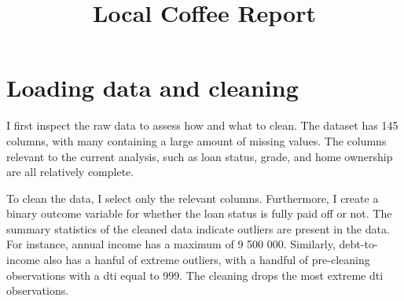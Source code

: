 \documentclass[11pt,preprint]{elsarticle}
\numberwithin{equation}{section}
\numberwithin{figure}{section}
\numberwithin{table}{section}
\begin{document}
\begin{frontmatter}  %

\title{Local Coffee Report}













\vspace{1cm}





\vspace{0.5cm}

\end{frontmatter}

\setcounter{footnote}{0}



\pagestyle{fancy}
\chead{}
\rhead{}
\lfoot{}
\lhead{}
\cfoot{}


\headsep 35pt %




\section{Loading data and cleaning}\label{loading-data-and-cleaning}

I first inspect the raw data to assess how and what to clean. The
dataset has 145 columns, with many containing a large amount of missing
values. The columns relevant to the current analysis, such as loan
status, grade, and home ownership are all relatively complete.

To clean the data, I select only the relevant columns. Furthermore, I
create a binary outcome variable for whether the loan status is fully
paid off or not. The summary statistics of the cleaned data indicate
outliers are present in the data. For instance, annual income has a
maximum of 9 500 000. Similarly, debt-to-income also has a hanful of
extreme outliers, with a handful of pre-cleaning observations with a dti
equal to 999. The cleaning drops the most extreme dti observations.
\end{document}
